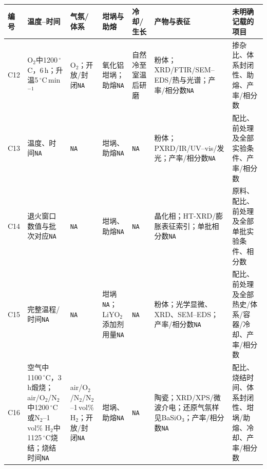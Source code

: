 \begin{table}[p]
\vspace{4pt}
\begin{tabular}{P{0.045\textwidth}P{0.15\textwidth}P{0.12\textwidth}P{0.17\textwidth}P{0.15\textwidth}P{0.17\textwidth}P{0.14\textwidth}}
\toprule
编号 & 温度--时间 & 气氛/体系 & 坩埚与助熔 & 冷却/生长 & 产物与表征 & 未明确记载的项目\\
\midrule
C12 & O$_2$中1200\,$^\circ$C，6\,h；升温5\,$^\circ$C\,min$^{-1}$ & O$_2$；开放/封闭\texttt{NA} & 氧化铝坩埚；助熔\texttt{NA} & 自然冷至室温后研磨 & 粉体；XRD/FTIR/SEM--EDS/热与光谱；产率/相分数\texttt{NA} & 掺杂比、体系封闭性、助熔、产率/相分数\\
C13 & 温度、时间\texttt{NA} & \texttt{NA} & 坩埚、助熔\texttt{NA} & \texttt{NA} & 粉体；PXRD/IR/UV--vis/发光；产率/相分数\texttt{NA} & 配比、前处理及全部实验条件、产率/相分数\\
C14 & 退火窗口数值与批次对应\texttt{NA} & \texttt{NA} & 坩埚、助熔\texttt{NA} & \texttt{NA} & 晶化相；HT-XRD/膨胀表征索引；单批相分数\texttt{NA} & 原料、配比、前处理及全部单批实验条件、相分数\\
C15 & 完整温程/时间\texttt{NA} & \texttt{NA} & 坩埚\texttt{NA}；LiYO$_2$添加剂用量\texttt{NA} & \texttt{NA} & 粉体；光学显微、XRD、SEM--EDS；产率/相分数\texttt{NA} & 配比、前处理及全部热史/体系/容器/冷却、产率/相分数\\
C16 & 空气中1100\,$^\circ$C，3\,h煅烧；air/O$_2$/N$_2$中1200\,$^\circ$C或N$_2$--1\,vol\% H$_2$中1125\,$^\circ$C烧结；烧结时间\texttt{NA} & air/O$_2$/N$_2$/N$_2$--1\,vol\% H$_2$；开放/封闭\texttt{NA} & 坩埚、助熔\texttt{NA} & \texttt{NA} & 陶瓷；XRD/XPS/微波介电；还原气氛样见BaSiO$_3$；产率/相分数\texttt{NA} & 配比、烧结时间、体系封闭性、坩埚/助熔、冷却、产率/相分数\\
\bottomrule
\end{tabular}
\end{table}
